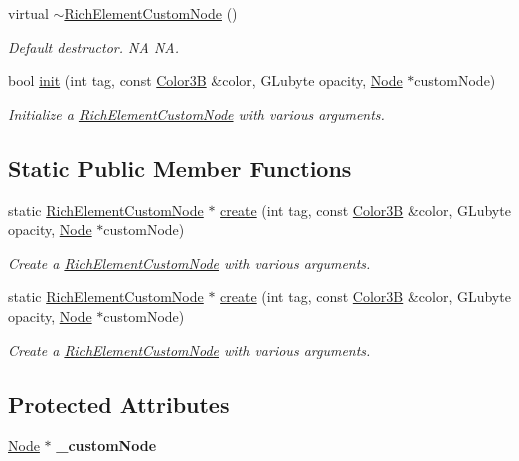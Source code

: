 \begin{DoxyCompactItemize}
virtual \hyperlink{classui_1_1RichElementCustomNode_a0200bb09dcff76ec26ce4fdfadc14f32}{$\sim$\+Rich\+Element\+Custom\+Node} ()
\begin{DoxyCompactList}\small\item\em Default destructor.  NA  NA. \end{DoxyCompactList}\item 
bool \hyperlink{classui_1_1RichElementCustomNode_a6dba66cc3d97ab82c9f17c35f800a4d6}{init} (int tag, const \hyperlink{structColor3B}{Color3B} \&color, G\+Lubyte opacity, \hyperlink{classNode}{Node} $\ast$custom\+Node)
\begin{DoxyCompactList}\small\item\em Initialize a \hyperlink{classui_1_1RichElementCustomNode}{Rich\+Element\+Custom\+Node} with various arguments. \end{DoxyCompactList}\end{DoxyCompactItemize}
\subsection*{Static Public Member Functions}
\begin{DoxyCompactItemize}
\item 
static \hyperlink{classui_1_1RichElementCustomNode}{Rich\+Element\+Custom\+Node} $\ast$ \hyperlink{classui_1_1RichElementCustomNode_a3788585f7191542cfcb534211bfe310e}{create} (int tag, const \hyperlink{structColor3B}{Color3B} \&color, G\+Lubyte opacity, \hyperlink{classNode}{Node} $\ast$custom\+Node)
\begin{DoxyCompactList}\small\item\em Create a \hyperlink{classui_1_1RichElementCustomNode}{Rich\+Element\+Custom\+Node} with various arguments. \end{DoxyCompactList}\item 
static \hyperlink{classui_1_1RichElementCustomNode}{Rich\+Element\+Custom\+Node} $\ast$ \hyperlink{classui_1_1RichElementCustomNode_a3788585f7191542cfcb534211bfe310e}{create} (int tag, const \hyperlink{structColor3B}{Color3B} \&color, G\+Lubyte opacity, \hyperlink{classNode}{Node} $\ast$custom\+Node)
\begin{DoxyCompactList}\small\item\em Create a \hyperlink{classui_1_1RichElementCustomNode}{Rich\+Element\+Custom\+Node} with various arguments. \end{DoxyCompactList}\end{DoxyCompactItemize}
\subsection*{Protected Attributes}
\begin{DoxyCompactItemize}
\item 
\mbox{\label{classui_1_1RichElementCustomNode_a6d26e1cb1b69e328df69fa00e8eb8cba}} 
\hyperlink{classNode}{Node} $\ast$ {\bfseries \+\_\+custom\+Node}
\end{DoxyCompactItemize}
